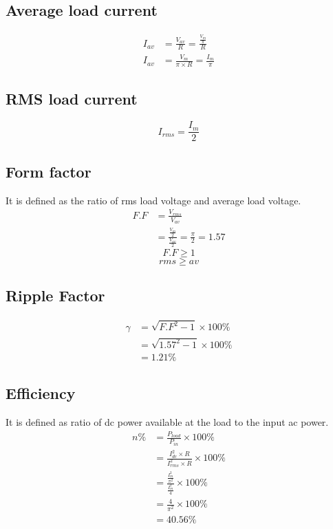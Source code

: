 		\subsection{Average load current}
			\begin{align*}
				I_{av} &= \frac{V_{av}}{R} =\frac{\frac{V_m}{\pi}}{R}\\
				I_{av} &= \frac{V_{m}}{\pi \times R}=\frac{I_m}{\pi}
			\end{align*}
		
		\subsection{RMS load current}			
			$$I_{rms}=\frac {I_m}{2}$$
			
		\subsection{Form factor}
			It is defined as the ratio of rms load voltage and average load voltage.
			\begin{align*}					
				F.F &= \frac{V_{rms}}{V_{av}}\\
				&= \frac{\frac{V_{m}}{2}}{\frac{V_{av}}{2}}=\frac{\pi}{2}=1.57
			\end{align*}
			$$F.F \geq 1$$
			$$rms \geq av$$
		
		\subsection{Ripple Factor}			
			\begin{align*}
				\gamma &= \sqrt{{F.F}^2-1} \times 100\%\\
				&= \sqrt{{1.57}^2-1} \times 100\%\\
				&= 1.21\%
			\end{align*}		
		\subsection{Efficiency}
			It is defined as ratio of dc power available at the load to the input ac power.
			\begin{align*}
				n\% &= \frac{P_{load}}{P_{in}} \times 100\%\\
				&= \frac {{I_{dc}^2} \times R}{{I_{rms}^2} \times R}\times 100\%\\
				&= \frac{\frac {I_{m}^2}{\pi^2}}{\frac{I_{m}^2}{4}}\times 100\%\\
				&= \frac{4}{\pi^2}\times 100\%\\
				&= 40.56 \%
			\end{align*}
	
